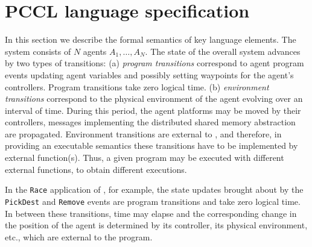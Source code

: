 \section[h]{PCCL language specification}




\label{sect:semantics}

In this section we describe the formal semantics of key language elements. 
The system consists of $N$ agents $A_1,\ldots,A_N$. The state of the overall system advances by two types of transitions: 
(a) {\em program transitions\/} correspond to agent program events updating agent variables and possibly setting waypoints for the agent's controllers. Program transitions take zero logical time.
(b) {\em environment transitions\/} 
correspond to the physical environment of the agent evolving over an interval of time. During this period, the agent platforms may be moved by their controllers, messages implementing the distributed shared memory abstraction are propagated. 
Environment transitions  are external to \rolang, and therefore, in providing an executable semantics these transitions have to be implemented by external function(s).
%
Thus, a given \rolang program may be executed with different  external functions, to obtain different executions.
%

In the \texttt{Race} application of , for example, the state updates brought about by the \texttt{PickDest} and \texttt{Remove} events are program transitions and take zero logical time. In between these transitions, time may elapse and the corresponding change in the position of the agent is determined by its controller, its physical environment, etc., which are external to the program. 

%
%

